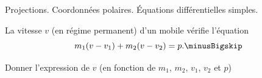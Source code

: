 \begin{prerequis}
	Projections. Coordonnées polaires. Équations différentielles simples.
\end{prerequis}












\hauteurLargeurCadreReponse		{1cm}{4.4cm}
\initialisationEntrainement


\debutEntrainement

	La vitesse $v$ (en régime permanent) d'un mobile vérifie l'équation
	\[
	m_1(v-v_1) + m_2(v-v_2) = p.\minusBigskip
	\]
	


\begin{enonce}
Donner l'expression de $v$ (en fonction de $m_1$, $m_2$, $v_1$, $v_2$ et $p$)
\end{enonce}

